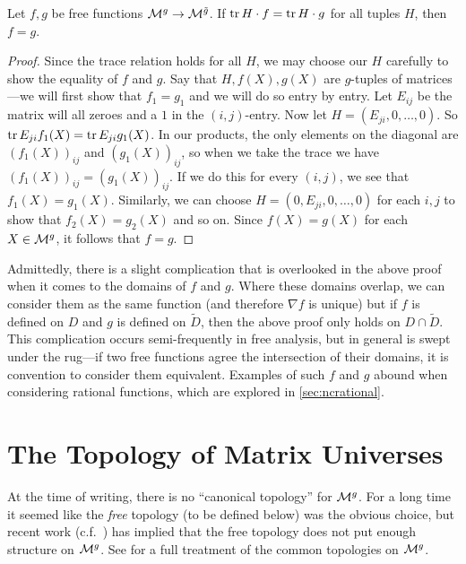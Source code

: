 \begin{theorem}%
\label{thm:trdual}
Let \(f,g\) be free functions \(\mathcal{M}^{g} \to \mathcal{M}^{\tilde{g}} \). If
\(\operatorname{tr} H \cdot f = \operatorname{tr} H \cdot g\) for all tuples \(H\), then \(f=g\).
\end{theorem}

\begin{proof}
  Since the trace relation holds for all $H$, we may choose our $H$ carefully to
  show the equality of $f$ and $g$. Say that $H,f(X),g(X)$ are $g$-tuples of
  matrices---we will first show that $f_1=g_1$ and we will do so entry by entry.
  Let $E_{ij}$ be the matrix will all zeroes and a \(1\) in the $(i,j)$-entry.  Now
  let $H= (E_{ji},0, \dots ,0)$. So $\operatorname{tr} E_{ji}f_1(X) = \operatorname{tr} E_{ji}g_1(X)$.
  In our products, the only elements on the diagonal are $(f_1(X))_{ij}$ and
  $(g_1(X))_{ij}$, so when we take the trace we have $(f_1(X))_{ij} =(g_1(X))_{ij}$. If we
  do this for every $(i,j)$, we see that $f_1(X)=g_1(X)$. Similarly, we can choose
  \(H = ( 0, E_{ji},0, \dots, 0)\) for each \(i,j\) to show that \(f_2(X)=g_2(X)\) and
  so on. Since \(f(X)=g(X)\) for each \(X \in \mathcal{M}^{g} \), it follows that \(f=g\).
\end{proof}

Admittedly, there is a slight complication that is overlooked in the above proof
when it comes to the domains of \(f\) and \(g\). Where these domains overlap, we
can consider them as the same function (and therefore \(\nabla f \) is unique)
but if \(f\) is defined on \(D\) and \(g\) is defined on \(\tilde{D}\), then the
above proof only holds on \(D \cap \tilde{D}\). This complication  occurs
semi-frequently in free analysis, but in general is swept under the rug---if two
free functions agree the intersection of their domains, it is convention to
consider them equivalent. Examples
of such \(f\) and \(g\) abound when considering rational functions, which are
explored in \cref{sec:ncrational}.

\section{The Topology of Matrix Universes }%
\label{sec:TopManUniv}

At the time of writing, there is no ``canonical topology'' for \(\mathcal{M}^g\). For a
long time it seemed like the \emph{free} topology (to be defined below) was the
obvious choice, but recent work (c.f.\ \cite{pascoeentire2019}) has implied that the free
topology does not put enough structure on \(\mathcal{M}^g\). See \cite{aglerAspects2016}
for a full treatment of the common topologies on \(\mathcal{M}^g\).

